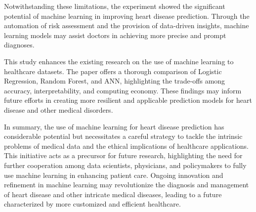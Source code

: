 Notwithstanding these limitations, the experiment showed the significant potential of machine learning in improving heart disease prediction. Through the automation of risk assessment and the provision of data-driven insights, machine learning models may assist doctors in achieving more precise and prompt diagnoses.

This study enhances the existing research on the use of machine learning to healthcare datasets. The paper offers a thorough comparison of Logistic Regression, Random Forest, and ANN, highlighting the trade-offs among accuracy, interpretability, and computing economy. These findings may inform future efforts in creating more resilient and applicable prediction models for heart disease and other medical disorders.

In summary, the use of machine learning for heart disease prediction has considerable potential but necessitates a careful strategy to tackle the intrinsic problems of medical data and the ethical implications of healthcare applications. This initiative acts as a precursor for future research, highlighting the need for further cooperation among data scientists, physicians, and policymakers to fully use machine learning in enhancing patient care. Ongoing innovation and refinement in machine learning may revolutionize the diagnosis and management of heart disease and other intricate medical diseases, leading to a future characterized by more customized and efficient healthcare.

